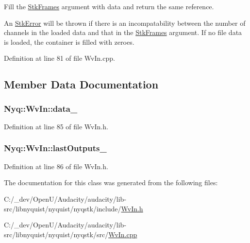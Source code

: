 Fill the \hyperlink{class_nyq_1_1_stk_frames}{Stk\+Frames} argument with data and return the same reference. 

An \hyperlink{class_nyq_1_1_stk_error}{Stk\+Error} will be thrown if there is an incompatability between the number of channels in the loaded data and that in the \hyperlink{class_nyq_1_1_stk_frames}{Stk\+Frames} argument. If no file data is loaded, the container is filled with zeroes. 

Definition at line 81 of file Wv\+In.\+cpp.



\subsection{Member Data Documentation}
\subsubsection[{\texorpdfstring{data\+\_\+}{data_}}]{ Nyq\+::\+Wv\+In\+::data\+\_\+\hspace{0.3cm}{\ttfamily [protected]}}\hypertarget{class_nyq_1_1_wv_in_a01d4dacc6073539a8e5d503ceea09597}{}\label{class_nyq_1_1_wv_in_a01d4dacc6073539a8e5d503ceea09597}


Definition at line 85 of file Wv\+In.\+h.

\subsubsection[{\texorpdfstring{last\+Outputs\+\_\+}{lastOutputs_}}]{ Nyq\+::\+Wv\+In\+::last\+Outputs\+\_\+\hspace{0.3cm}{\ttfamily [protected]}}\hypertarget{class_nyq_1_1_wv_in_ae7ce6fc9a48173562aa963d4fff6e523}{}\label{class_nyq_1_1_wv_in_ae7ce6fc9a48173562aa963d4fff6e523}


Definition at line 86 of file Wv\+In.\+h.



The documentation for this class was generated from the following files\+:\begin{DoxyCompactItemize}
\item 
C\+:/\+\_\+dev/\+Open\+U/\+Audacity/audacity/lib-\/src/libnyquist/nyquist/nyqstk/include/\hyperlink{_wv_in_8h}{Wv\+In.\+h}\item 
C\+:/\+\_\+dev/\+Open\+U/\+Audacity/audacity/lib-\/src/libnyquist/nyquist/nyqstk/src/\hyperlink{_wv_in_8cpp}{Wv\+In.\+cpp}\end{DoxyCompactItemize}
